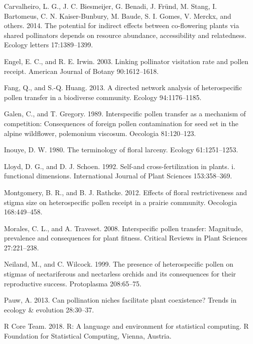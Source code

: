 \documentclass[11pt,a4paper]{article}
\begin{document}
\hypertarget{ref-carvalheiro2014}{}
Carvalheiro, L. G., J. C. Biesmeijer, G. Benadi, J. Fründ, M. Stang, I.
Bartomeus, C. N. Kaiser-Bunbury, M. Baude, S. I. Gomes, V. Merckx, and
others. 2014. The potential for indirect effects between co-flowering
plants via shared pollinators depends on resource abundance,
accessibility and relatedness. Ecology letters 17:1389--1399.

\hypertarget{ref-engel2003}{}
Engel, E. C., and R. E. Irwin. 2003. Linking pollinator visitation rate
and pollen receipt. American Journal of Botany 90:1612--1618.

\hypertarget{ref-fang2013}{}
Fang, Q., and S.-Q. Huang. 2013. A directed network analysis of
heterospecific pollen transfer in a biodiverse community. Ecology
94:1176--1185.

\hypertarget{ref-galen1989}{}
Galen, C., and T. Gregory. 1989. Interspecific pollen transfer as a
mechanism of competition: Consequences of foreign pollen contamination
for seed set in the alpine wildflower, polemonium viscosum. Oecologia
81:120--123.

\hypertarget{ref-inouye1980}{}
Inouye, D. W. 1980. The terminology of floral larceny. Ecology
61:1251--1253.

\hypertarget{ref-lloyd1992}{}
Lloyd, D. G., and D. J. Schoen. 1992. Self-and cross-fertilization in
plants. i. functional dimensions. International Journal of Plant
Sciences 153:358--369.

\hypertarget{ref-montgomery2012}{}
Montgomery, B. R., and B. J. Rathcke. 2012. Effects of floral
restrictiveness and stigma size on heterospecific pollen receipt in a
prairie community. Oecologia 168:449--458.

\hypertarget{ref-morales2008}{}
Morales, C. L., and A. Traveset. 2008. Interspecific pollen transfer:
Magnitude, prevalence and consequences for plant fitness. Critical
Reviews in Plant Sciences 27:221--238.

\hypertarget{ref-neiland1999}{}
Neiland, M., and C. Wilcock. 1999. The presence of heterospecific pollen
on stigmas of nectariferous and nectarless orchids and its consequences
for their reproductive success. Protoplasma 208:65--75.

\hypertarget{ref-pauw2013}{}
Pauw, A. 2013. Can pollination niches facilitate plant coexistence?
Trends in ecology \& evolution 28:30--37.

\hypertarget{ref-R_Core_Team_2018}{}
R Core Team. 2018. R: A language and environment for statistical
computing. R Foundation for Statistical Computing, Vienna, Austria.
\end{document}
